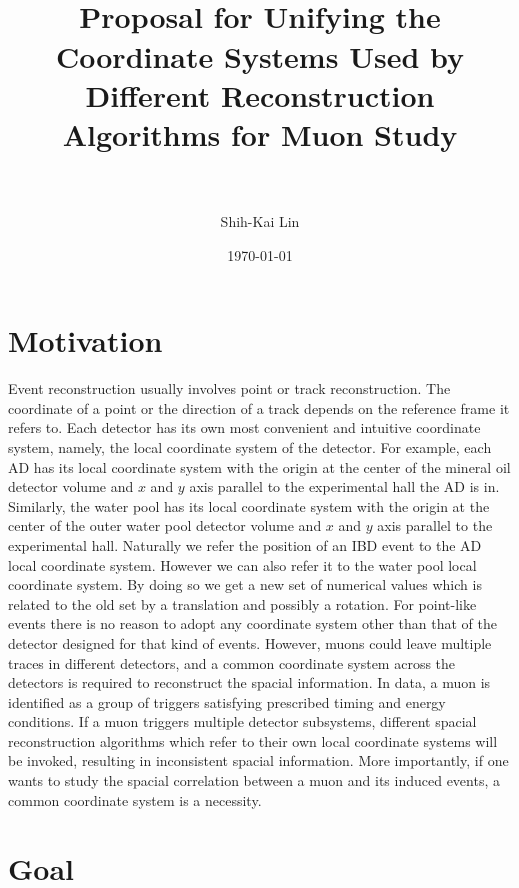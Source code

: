 \documentclass[letterpaper, 11pt]{scrartcl} %
\title{	
\normalfont \normalsize 
\horrule{0.5pt} \\[0.4cm] %
\huge Proposal for Unifying the Coordinate Systems Used by Different Reconstruction Algorithms for Muon Study \\ %
\horrule{2pt} \\[0.5cm] %
}
\author{Shih-Kai Lin} %
\date{\normalsize\today} %
\numberwithin{equation}{section} %
\numberwithin{figure}{section} %
\numberwithin{table}{section} %
\begin{document}
\maketitle %


\section{Motivation}

Event reconstruction usually involves point or track reconstruction. The coordinate of a point or the direction of a track depends on the reference frame it refers to. Each detector has its own most convenient and intuitive coordinate system, namely, the local coordinate system of the detector. For example, each AD has its local coordinate system with the origin at the center of the mineral oil detector volume and $x$ and $y$ axis parallel to the experimental hall the AD is in. Similarly, the water pool has its local coordinate system with the origin at the center of the outer water pool detector volume and $x$ and $y$ axis parallel to the experimental hall. Naturally we refer the position of an IBD event to the AD local coordinate system. However we can also refer it to the water pool local coordinate system. By doing so we get a new set of numerical values which is related to the old set by a translation and possibly a rotation. For point-like events there is no reason to adopt any coordinate system other than that of the detector designed for that kind of events. However, muons could leave multiple traces in different detectors, and a common coordinate system across the detectors is required to reconstruct the spacial information. In data, a muon is identified as a group of triggers satisfying prescribed timing and energy conditions. If a muon triggers multiple detector subsystems, different spacial reconstruction algorithms which refer to their own local coordinate systems will be invoked, resulting in inconsistent spacial information. More importantly, if one wants to study the spacial correlation between a muon and its induced events, a common coordinate system is a necessity.


\section{Goal}
\end{document}
